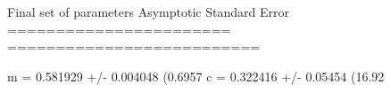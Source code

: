 Final set of parameters            Asymptotic Standard Error
=======================            ==========================

m               = 0.581929         +/- 0.004048     (0.6957%
c               = 0.322416         +/- 0.05454      (16.92%
